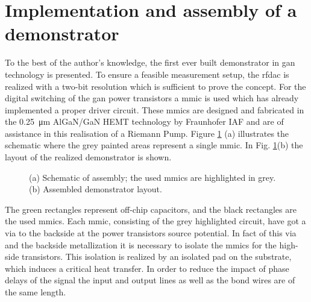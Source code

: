 \documentclass[journal]{IEEEtran}
\begin{document}
\section{Implementation and assembly of a demonstrator}
\label{sec:assembly}
To the best of the author's knowledge, the first ever built demonstrator in \gls{gan} technology is presented.
To ensure a feasible measurement setup, the \gls{rfdac} is realized with a two-bit resolution which is sufficient to prove the concept.
For the digital switching of the \gls{gan} power transistors a \gls{mmic} is used which has already implemented a proper driver circuit.
These \glspl{mmic} are designed and fabricated in the \SI{0.25}{\micro\meter} AlGaN/GaN HEMT technology by Fraunhofer IAF \cite{MaroldtDriverConcept} and are of assistance in this realisation of a Riemann Pump.
Figure \ref{fig:assembled_demonstrator} (a) illustrates the schematic where the grey painted areas represent a single \gls{mmic}.
In Fig. \ref{fig:assembled_demonstrator}(b) the layout of the realized demonstrator is shown.
%
\begin{figure}[htb]
  \centering
	\begin{scriptsize}
  	\def\svgwidth{\columnwidth}
 	 
  	\caption{(a) Schematic of assembly; the used \glspl{mmic} are highlighted in grey. (b) Assembled demonstrator layout.}
  	\label{fig:assembled_demonstrator}
	\end{scriptsize}
\end{figure}
%
The green rectangles represent off-chip capacitors, and the black rectangles are the used \glspl{mmic}.
Each \gls{mmic}, consisting of the grey highlighted circuit, have got a via to the backside at the power transistors source potential.
In fact of this via and the backside metallization it is necessary to isolate the \glspl{mmic} for the high-side transistors.
This isolation is realized by an isolated pad on the substrate, which induces a critical heat transfer.
In order to reduce the impact of phase delays of the signal the input and output lines as well as the bond wires are of the same length.
\end{document}
